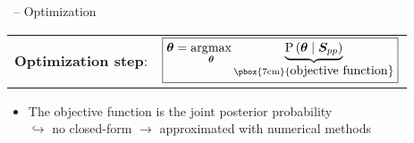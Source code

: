 \documentclass[10pt,xcolor=x11names,compress, show notes]{beamer}%
\begin{document}
\begin{frame}{\insertsectionhead ~-- Optimization}
	\centering
	\vfill	
	\begin{tabular}{c c}
		\textbf{Optimization step}:&
		$\boxed{ \displaystyle  \bm{\theta} =\underset{\bm{\theta}}{\arg\!\max} \underbrace{\text{P} \left( \bm{\theta} \mid \bm{S}_{pp}\right)}_{ \text{\pbox{7cm}{\centering \normalsize objective function}}}}$ %
	\end{tabular}
	\vfill
	\flushleft
	\begin{itemize}
        		\item The objective function is the joint posterior probability\\  $\hookrightarrow$ no closed-form	$\rightarrow$ approximated with numerical methods
\end{itemize}
	
	


\end{frame}
\end{document}
